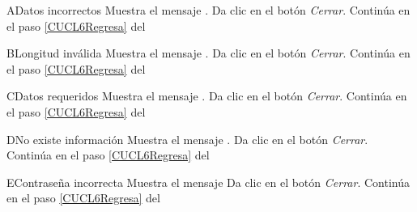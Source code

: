 
\begin{UCtrayectoriaA}{A}{Datos incorrectos}
	\UCpaso Muestra el mensaje . 
	\UCpaso[\UCactor] Da clic en el botón \textit{Cerrar}.
	\UCpaso[\UCactor] Continúa en el paso \ref{CUCL6Regresa} del 

\end{UCtrayectoriaA} 

\begin{UCtrayectoriaA}{B}{Longitud inválida}
	\UCpaso Muestra el mensaje . 
	\UCpaso[\UCactor] Da clic en el botón \textit{Cerrar}.
	\UCpaso[\UCactor] Continúa en el paso \ref{CUCL6Regresa} del 

\end{UCtrayectoriaA}

\begin{UCtrayectoriaA}{C}{Datos requeridos}
	\UCpaso Muestra el mensaje . 
	\UCpaso[\UCactor] Da clic en el botón \textit{Cerrar}.
	\UCpaso[\UCactor] Continúa en el paso \ref{CUCL6Regresa} del 

\end{UCtrayectoriaA}

\begin{UCtrayectoriaA}{D}{No existe información}
	\UCpaso Muestra el mensaje . 
	\UCpaso[\UCactor] Da clic en el botón \textit{Cerrar}.
	\UCpaso[\UCactor] Continúa en el paso \ref{CUCL6Regresa} del 

\end{UCtrayectoriaA}


\begin{UCtrayectoriaA}{E}{Contraseña incorrecta}
	\UCpaso Muestra el mensaje  
	\UCpaso[\UCactor] Da clic en el botón \textit{Cerrar}.
	\UCpaso[\UCactor] Continúa en el paso \ref{CUCL6Regresa} del 

\end{UCtrayectoriaA} 

		
